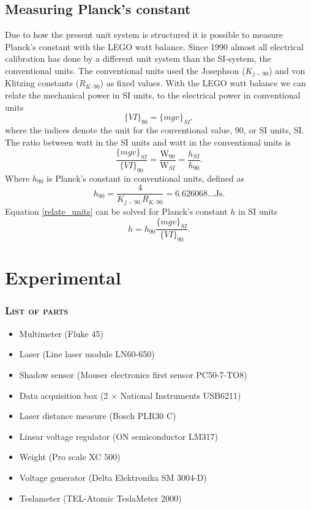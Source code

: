 \documentclass[english,a4paper,12pt,reprint]{revtex4-1}
\begin{document}
\subsection{Measuring Planck's constant}
Due to how the present unit system is structured it is possible to measure Planck's constant with the LEGO watt balance. Since 1990 almost all electrical calibration has done by a different unit system than the SI-system, the conventional units. The conventional units used the Josephson ($K_{j-90}$) and von Klitzing constants ($R_{K–90}$) as fixed values. With the LEGO watt balance we can relate the mechanical power in SI units, to the electrical power in conventional units
\begin{equation*}
    \{VI\}_{90} = \{mgv\}_{SI},
\end{equation*}
where the indices denote the unit for the conventional value, $90$, or SI units, SI. The ratio between watt in the SI units and watt in the conventional units is
\begin{equation}
    \frac{\{mgv\}_{SI}}{ \{VI\}_{90}} = \frac{\text{W}_{90}}{\text{W}_{SI}} = \frac{h_{SI}}{h_{90}} \label{relate_units}.
\end{equation}
Where $h_{90}$ is Planck's constant in conventional units, defined as \begin{equation}
    h_{90} = \frac{4}{K_{j-90}\,R_{K–90}} = 6.626068\ldots\text{Js}.
\end{equation}
Equation \eqref{relate_units} can be solved for Planck's constant $h$ in SI units
\begin{equation}
    h = h_{90}\frac{\{mgv\}_{SI}}{ \{VI\}_{90}}. \label{planck}
\end{equation}


\section{Experimental}
\subsubsection*{\textsc{List of parts}}
\begin{itemize}
  \item Multimeter (Fluke 45)
  \item Laser (Line laser module LN60-650)
  \item Shadow sensor  (Mouser electronics first sensor PC50-7-TO8)
  \item Data acquisition box (2 $\times$ National Instruments USB6211)
  \item Laser distance measure (Bosch PLR30 C)
  \item Linear voltage regulator (ON semiconductor LM317)
  \item Weight  (Pro scale XC 500)
  \item Voltage generator (Delta Elektronika SM 3004-D)
  \item Teslameter (TEL-Atomic TeslaMeter 2000)
\end{itemize}
\end{document}
